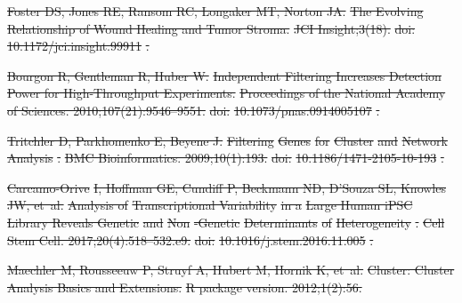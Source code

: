 \documentclass[10pt,letterpaper]{article}
\providecommand{\DIFdeltex}[1]{{\protect\color{red}\sout{#1}}}                      %
\providecommand{\DIFdel}[1]{\texorpdfstring{\DIFdeltex{#1}}{}} %
\begin{document}
\begin{thebibliography}{10}
\DIFdel{Foster DS, Jones RE, Ransom RC, Longaker MT, Norton JA.
	}%
\DIFdel{The Evolving Relationship of Wound Healing and Tumor Stroma.
	}%
\DIFdel{JCI Insight;3(18).
	}%
\DIFdel{doi:}%
\DIFdel{10.1172/jci.insight.99911}%
\DIFdel{.
	}%

\DIFdel{Bourgon R, Gentleman R, Huber W.
	}%
\DIFdel{Independent Filtering Increases Detection Power for High-Throughput
	Experiments.
	}%
\DIFdel{Proceedings of the National Academy of Sciences.
	2010;107(21):9546--9551.
	}%
\DIFdel{doi:}%
\DIFdel{10.1073/pnas.0914005107}%
\DIFdel{.
	}%

\DIFdel{Tritchler D, Parkhomenko E, Beyene J.
	}%
\DIFdel{Filtering }%
\DIFdel{Genes}%
\DIFdel{for }%
\DIFdel{Cluster}%
\DIFdel{and }%
\DIFdel{Network Analysis}%
\DIFdel{.
	}%
\DIFdel{BMC Bioinformatics. 2009;10(1):193.
	}%
\DIFdel{doi:}%
\DIFdel{10.1186/1471-2105-10-193}%
\DIFdel{.
	}%

\DIFdel{Carcamo-Orive}%
\DIFdel{I, Hoffman GE, Cundiff P, Beckmann ND, D'Souza SL, Knowles JW,
	et~al.
	}%
\DIFdel{Analysis of }%
\DIFdel{Transcriptional Variability}%
\DIFdel{in a }%
\DIFdel{Large Human iPSC
			Library Reveals Genetic}%
\DIFdel{and }%
\DIFdel{Non}%
\DIFdel{-Genetic }%
\DIFdel{Determinants}%
\DIFdel{of
	}%
\DIFdel{Heterogeneity}%
\DIFdel{.
	}%
\DIFdel{Cell Stem Cell. 2017;20(4):518--532.e9.
	}%
\DIFdel{doi:}%
\DIFdel{10.1016/j.stem.2016.11.005}%
\DIFdel{.
	}%

\DIFdel{Maechler M, Rousseeuw P, Struyf A, Hubert M, Hornik K, et~al.
	}%
\DIFdel{Cluster: Cluster Analysis Basics and Extensions.
	}%
\DIFdel{R package version. 2012;1(2):56.
	}%


\end{thebibliography}
\end{document}
